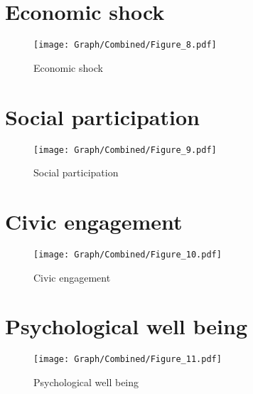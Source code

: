 \documentclass[10pt,a4paper]{article}
\begin{document}
\section{Economic shock}
\begin{table}[H]\centering

\end{table}
\begin{figure}[H]\centering
\texttt{[image: Graph/Combined/Figure\_8.pdf]}
\caption{Economic shock} \label{fig:Fig_8}
\end{figure}
\begin{table}[H]\centering

\end{table}
\pagebreak
\section{Social participation}
\begin{table}[H]\centering

\end{table}
\begin{figure}[H]\centering
\texttt{[image: Graph/Combined/Figure\_9.pdf]}
\caption{Social participation} \label{fig:Fig_9}
\end{figure}
\begin{table}[H]\centering

\end{table}
\pagebreak
\section{Civic engagement}
\begin{table}[H]\centering

\end{table}
\begin{figure}[H]\centering
\texttt{[image: Graph/Combined/Figure\_10.pdf]}
\caption{Civic engagement} \label{fig:Fig_10}
\end{figure}
\begin{table}[H]\centering

\end{table}
\pagebreak
\section{Psychological well being}
\begin{table}[H]\centering

\end{table}
\begin{figure}[H]\centering
\texttt{[image: Graph/Combined/Figure\_11.pdf]}
\caption{Psychological well being} \label{fig:Fig_11}
\end{figure}
\begin{table}[H]\centering

\end{table}
\pagebreak
\end{document}
